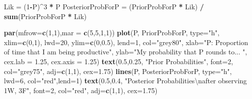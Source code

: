 \documentclass[]{book}
\newenvironment{Shaded}{\begin{snugshade}}{\end{snugshade}}
\newcommand{\CharTok}[1]{\textcolor[rgb]{0.31,0.60,0.02}{#1}}
\newcommand{\DataTypeTok}[1]{\textcolor[rgb]{0.13,0.29,0.53}{#1}}
\newcommand{\DecValTok}[1]{\textcolor[rgb]{0.00,0.00,0.81}{#1}}
\newcommand{\FloatTok}[1]{\textcolor[rgb]{0.00,0.00,0.81}{#1}}
\newcommand{\KeywordTok}[1]{\textcolor[rgb]{0.13,0.29,0.53}{\textbf{#1}}}
\newcommand{\NormalTok}[1]{#1}
\newcommand{\OperatorTok}[1]{\textcolor[rgb]{0.81,0.36,0.00}{\textbf{#1}}}
\newcommand{\StringTok}[1]{\textcolor[rgb]{0.31,0.60,0.02}{#1}}
\begin{document}
\begin{Shaded}
\begin{Highlighting}[]
\NormalTok{Lik =}\StringTok{ }\NormalTok{(}\DecValTok{1}\OperatorTok{-}\NormalTok{P)}\OperatorTok{^}\DecValTok{3} \OperatorTok{*}\StringTok{ }\NormalTok{P}
\NormalTok{PosteriorProbForP =}\StringTok{ }\NormalTok{(PriorProbForP }\OperatorTok{*}\StringTok{ }\NormalTok{Lik) }\OperatorTok{/}\StringTok{ }\KeywordTok{sum}\NormalTok{(PriorProbForP }\OperatorTok{*}\StringTok{ }\NormalTok{Lik)}

\KeywordTok{par}\NormalTok{(}\DataTypeTok{mfrow=}\KeywordTok{c}\NormalTok{(}\DecValTok{1}\NormalTok{,}\DecValTok{1}\NormalTok{),}\DataTypeTok{mar =} \KeywordTok{c}\NormalTok{(}\DecValTok{5}\NormalTok{,}\DecValTok{5}\NormalTok{,}\DecValTok{1}\NormalTok{,}\DecValTok{1}\NormalTok{))}
\KeywordTok{plot}\NormalTok{(P, PriorProbForP, }\DataTypeTok{type=}\StringTok{"h"}\NormalTok{, }\DataTypeTok{xlim=}\KeywordTok{c}\NormalTok{(}\DecValTok{0}\NormalTok{,}\DecValTok{1}\NormalTok{),}
     \DataTypeTok{lwd=}\DecValTok{20}\NormalTok{, }\DataTypeTok{ylim=}\KeywordTok{c}\NormalTok{(}\DecValTok{0}\NormalTok{,}\FloatTok{0.5}\NormalTok{),  }\DataTypeTok{lend=}\DecValTok{1}\NormalTok{, }\DataTypeTok{col=}\StringTok{"grey80"}\NormalTok{,}
     \DataTypeTok{xlab=}\StringTok{"P: Proportion of time that I am being productive"}\NormalTok{,}
     \DataTypeTok{ylab=}\StringTok{"My probability that P rounds to... "}\NormalTok{,}
     \DataTypeTok{cex.lab =} \FloatTok{1.25}\NormalTok{, }\DataTypeTok{cex.axis =} \FloatTok{1.25}\NormalTok{)}
\KeywordTok{text}\NormalTok{(}\FloatTok{0.5}\NormalTok{,}\FloatTok{0.25}\NormalTok{, }\StringTok{"Prior Probabilities"}\NormalTok{, }\DataTypeTok{font=}\DecValTok{2}\NormalTok{,}
     \DataTypeTok{col=}\StringTok{"grey75"}\NormalTok{, }\DataTypeTok{adj=}\KeywordTok{c}\NormalTok{(}\DecValTok{1}\NormalTok{,}\DecValTok{1}\NormalTok{), }\DataTypeTok{cex=}\FloatTok{1.75}\NormalTok{)}
\KeywordTok{lines}\NormalTok{(P, PosteriorProbForP, }\DataTypeTok{type=}\StringTok{"h"}\NormalTok{, }\DataTypeTok{lwd=}\DecValTok{6}\NormalTok{, }\DataTypeTok{col=}\StringTok{"red"}\NormalTok{,}\DataTypeTok{lend=}\DecValTok{1}\NormalTok{)}
\KeywordTok{text}\NormalTok{(}\FloatTok{0.5}\NormalTok{,}\FloatTok{0.4}\NormalTok{, }\StringTok{"Posterior Probabilities}\CharTok{\textbackslash{}n}\StringTok{after observing 1W, 3F"}\NormalTok{, }\DataTypeTok{font=}\DecValTok{2}\NormalTok{,}
     \DataTypeTok{col=}\StringTok{"red"}\NormalTok{, }\DataTypeTok{adj=}\KeywordTok{c}\NormalTok{(}\DecValTok{1}\NormalTok{,}\DecValTok{1}\NormalTok{), }\DataTypeTok{cex=}\FloatTok{1.75}\NormalTok{)}
\end{Highlighting}
\end{Shaded}
\end{document}

